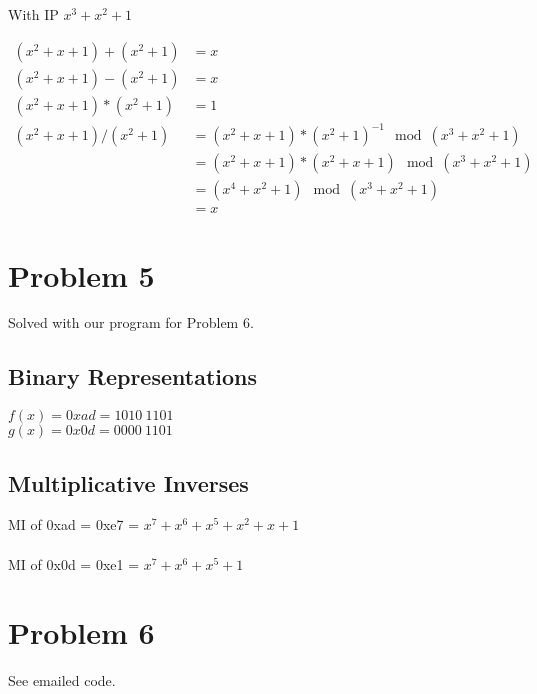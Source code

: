 \documentclass[letterpaper]{article}
\begin{document}
With IP \(x^3 + x^2 + 1\)

\begin{equation*}
  \begin{split}
    (x^2 + x + 1) + (x^2 + 1) &= x \\
    (x^2 + x + 1) - (x^2 + 1) &= x \\
    (x^2 + x + 1) * (x^2 + 1) &= 1 \\
    (x^2 + x + 1) / (x^2 + 1) &= (x^2 + x + 1) * (x^2 + 1)^{-1} \mod (x^3 + x^2 + 1) \\
    &= (x^2 + x + 1) * (x^2+x+1) \mod (x^3 + x^2 + 1) \\
    &= (x^4+x^2+1) \mod (x^3 + x^2 + 1) \\
    &= x
  \end{split}
\end{equation*}

\section{Problem 5}

Solved with our program for Problem 6.

\subsection{Binary Representations}

\(f(x) = 0xad = 1010\ 1101\) \\
\(g(x) = 0x0d = 0000\ 1101\) \\

\subsection{Multiplicative Inverses}

MI of 0xad = 0xe7 = \(x^7 + x^6 + x^5 + x^2 + x + 1\)\\
\\
MI of 0x0d = 0xe1 = \(x^7 + x^6 + x^5 + 1\)

\section{Problem 6}

See emailed code.
\end{document}
